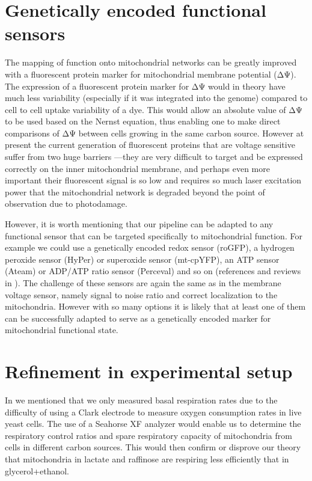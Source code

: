\section{Genetically encoded functional sensors}
The mapping of function onto mitochondrial networks can be greatly improved with a fluorescent protein marker for mitochondrial membrane potential (ΔΨ). The expression of a fluorescent protein marker for ΔΨ would in theory have much less variability (especially if it was integrated into the genome) compared to cell to cell uptake variability of a dye. This would allow an absolute value of ΔΨ to be used based on the Nernst equation, thus enabling one to make direct comparisons of ΔΨ between cells growing in the same carbon source. However at present the current generation of fluorescent proteins that are voltage sensitive suffer from two huge barriers \cite{akemann_imaging_2010,kralj_optical_2012,sunita_ghimire_gautam_exploration_2009}---they are very difficult to target and be expressed correctly on the inner mitochondrial membrane, and perhaps even more important their fluorescent signal is so low and requires so much laser excitation power that the mitochondrial network is degraded beyond the point of observation due to photodamage.

However, it is worth mentioning that our pipeline can be adapted to any functional sensor that can be targeted specifically to mitochondrial function. For example we could use a genetically encoded redox sensor (roGFP), a hydrogen peroxide sensor (HyPer) or superoxide sensor (mt-cpYFP), an ATP sensor (Ateam) or ADP/ATP ratio sensor (Perceval) and so on (references and reviews in \cite{newman_genetically_2011}). The challenge of these sensors are again the same as in the membrane voltage sensor, namely signal to noise ratio and correct localization to the mitochondria. However with so many options it is likely that at least one of them can be successfully adapted to serve as a genetically encoded marker for mitochondrial functional state.
\section{Refinement in experimental setup}
In  we mentioned that we only measured basal respiration rates due to the difficulty of using a Clark electrode to measure oxygen consumption rates in live yeast cells. The use of a Seahorse XF analyzer would enable us to determine the respiratory control ratios and spare respiratory capacity of mitochondria from cells in different carbon sources. This would then confirm or disprove our theory that mitochondria in lactate and raffinose are respiring less efficiently that in glycerol+ethanol.

